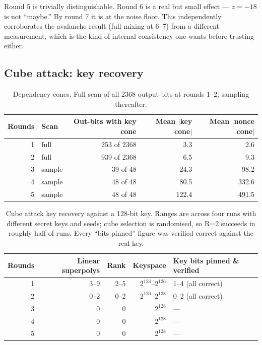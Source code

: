 \documentclass[11pt,a4paper]{article}
\theoremstyle{plain}
\theoremstyle{definition}
\theoremstyle{remark}
\begin{document}
Round 5 is trivially distinguishable. Round 6 is a real but small effect --- $z=-18$
is not ``maybe.'' By round 7 it is at the noise floor. This independently corroborates
the avalanche result (full mixing at 6--7) from a different measurement, which is the
kind of internal consistency one wants before trusting either.

\subsection{Cube attack: key recovery}

\begin{table}[h]
\centering
\caption{Dependency cones. Full scan of all 2368 output bits at rounds 1--2; sampling
thereafter.}
\begin{tabular}{rlrrr}
\toprule
Rounds & Scan & Out-bits with key cone & Mean $|$key cone$|$ & Mean $|$nonce cone$|$ \\
\midrule
1 & full   & 253 of 2368 & 3.3   & 2.6 \\
2 & full   & 939 of 2368 & 6.5   & 9.3 \\
3 & sample & 39 of 48    & 24.3  & 98.2 \\
4 & sample & 48 of 48    & 80.5  & 332.6 \\
5 & sample & 48 of 48    & 122.4 & 491.5 \\
\bottomrule
\end{tabular}
\end{table}

\begin{table}[h]
\centering
\caption{Cube attack key recovery against a 128-bit key. Ranges are across four runs
with different secret keys and seeds; cube selection is randomised, so R=2 succeeds in
roughly half of runs. Every ``bits pinned'' figure was verified correct against the
real key.}
\begin{tabular}{rrrrl}
\toprule
Rounds & Linear superpolys & Rank & Keyspace & Key bits pinned \& verified \\
\midrule
1 & 3--9 & 2--5 & $2^{123}$--$2^{126}$ & 1--4 (all correct) \\
2 & 0--2 & 0--2 & $2^{126}$--$2^{128}$ & 0--2 (all correct) \\
3 & 0 & 0 & $2^{128}$ & --- \\
4 & 0 & 0 & $2^{128}$ & --- \\
5 & 0 & 0 & $2^{128}$ & --- \\
\bottomrule
\end{tabular}
\end{table}
\end{document}
